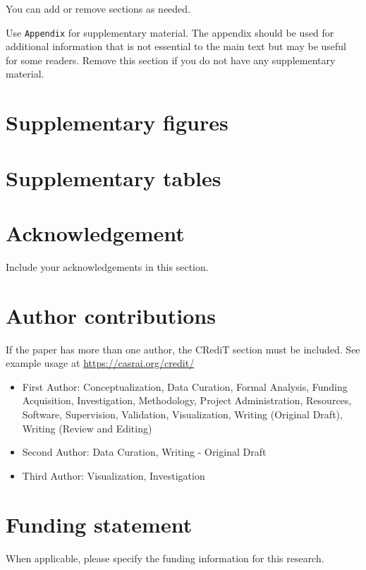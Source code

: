 \documentclass[
  manuscript=article,  %
  layout=preprint,  %
  year=20xx,
  volume=x,
]{extra/joas}
\begin{document}
You can add or remove sections as needed.

Use \verb|Appendix| for supplementary material. The appendix should be used for additional information that is not essential to the main text but may be useful for some readers. Remove this section if you do not have any supplementary material.

\appendix

\section{Supplementary figures}

\section{Supplementary tables}


\section*{Acknowledgement}
Include your acknowledgements in this section.

\section*{Author contributions}
If the paper has more than one author, the CRediT section must be included. See example usage at \url{https://casrai.org/credit/}

\begin{itemize}
  \item First Author: Conceptualization, Data Curation, Formal Analysis, Funding Acquisition, Investigation, Methodology, Project Administration, Resources, Software, Supervision, Validation, Visualization, Writing (Original Draft), Writing (Review and Editing)
  \item Second Author: Data Curation, Writing - Original Draft
  \item Third Author: Visualization, Investigation
\end{itemize}


\section*{Funding statement}
When applicable, please specify the funding information for this research.


\end{document}
